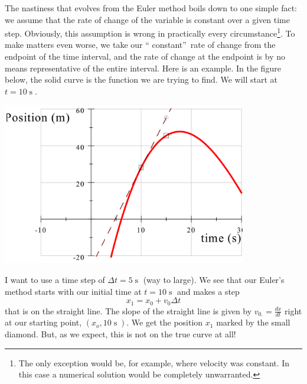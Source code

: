 \documentclass[twoside,11pt,ShortChapTitles]{BYUTextbook}
\begin{document}
The nastiness that evolves from the Euler method boils down to one simple
fact: we assume that the rate of change of the variable is constant over a
given time step. Obviously, this assumption is wrong in practically every
circumstance\footnote{The only exception would be, for example, where velocity
was constant. In this case a numerical solution would be completely
unwarranted.}. To make matters even worse, we take our \textquotedblleft
constant\textquotedblright\ rate of change from the endpoint of the time
interval, and the rate of change at the endpoint is by no means representative
of the entire interval. Here is an example. In the figure below, the solid
curve is the function we are trying to find. We will start at $t=10 \operatorname{s} .$ 

\begin{center}
\includegraphics[width=0.8\textwidth]{Lab7_figs/ParabTan.png}
\end{center}
I want to use a time step of $\Delta t=5 \operatorname{s} $ (way to large). We see that our Euler's method starts with our initial time
at $t=10 \operatorname{s} $ and makes a step
\[
x_{1}=x_{0}+v_{0}\Delta t
\]
that is on the straight line. The slope of the straight line is given by
$v_{0.}=\frac{dx}{dt}$ right at our starting point, $(x_{o},10 \operatorname{s} ).$ We get the position $x_{1}$ marked by the small diamond. But, as we
expect, this is not on the true curve at all!
\end{document}

